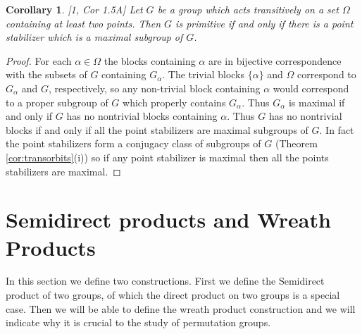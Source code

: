 \documentclass[]{article}
\newtheorem{cor}[thm]{Corollary}
\theoremstyle{definition}
\begin{document}
\begin{cor} \label{cor:primitive} \emph{[1, Cor 1.5A]}
	Let $G$ be a group which acts transitively on a set $\Omega$ containing at least two points. Then $G$ is primitive if and only if there is a point stabilizer which is a maximal subgroup of $G$.
\end{cor}

\begin{proof}
	For each $\alpha \in \Omega$ the blocks containing $\alpha$ are in bijective correspondence with the subsets of $G$ containing $G_\alpha$. The trivial blocks $\{\alpha \}$ and $\Omega$ correspond to $G_\alpha$ and $G$, respectively, so any non-trivial block containing $\alpha$ would correspond to a proper subgroup of $G$ which properly contains $G_\alpha$. Thus $G_\alpha$ is maximal if and only if $G$ has no nontrivial blocks containing $\alpha$. Thus $G$ has no nontrivial blocks if and only if all the point stabilizers are maximal subgroups of $G$. In fact the point stabilizers form a conjugacy class of subgroups of $G$ (Theorem \ref{cor:transorbits}(i)) so if any point stabilizer is maximal then all the points stabilizers are maximal.
\end{proof}
\clearpage
\section{Semidirect products and Wreath Products}
In this section we define two constructions. First we define the Semidirect product of two groups, of which the direct product on two groups is a special case. Then we will be able to define the wreath product construction and we will indicate why it is crucial to the study of permutation groups.
\end{document}
